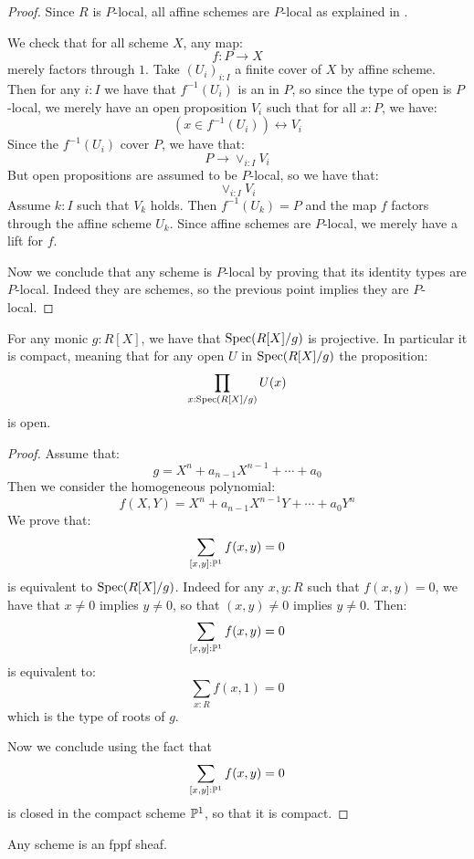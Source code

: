 \begin{proof}
Since $R$ is $P$-local, all affine schemes are $P$-local as explained in .

We check that for all scheme $X$, any map:
\[f:P\to X\]
merely factors through $1$. Take $(U_i)_{i:I}$ a finite cover of $X$ by affine scheme. Then for any $i:I$ we have that $f^{-1}(U_i)$ is an in $P$, so since the type of open is $P$-local, we merely have an open proposition $V_i$ such that for all $x:P$, we have:
\[(x\in f^{-1}(U_i) )\leftrightarrow V_i\]
Since the $f^{-1}(U_i)$ cover $P$, we have that:
\[P\to \lor_{i:I} V_i\]
But open propositions are assumed to be $P$-local, so we have that:
\[ \lor_{i:I} V_i\]
Assume $k:I$ such that $V_k$ holds. Then $f^{-1}(U_k) = P$ and the map $f$ factors through the affine scheme $U_k$. Since affine schemes are $P$-local, we merely have a lift for $f$.

Now we conclude that any scheme is $P$-local by proving that its identity types are $P$-local. Indeed they are schemes, so the previous point implies they are $P$-local.
\end{proof}

\begin{lemma}\label{roots-monic-proper}
For any monic $g:R[X]$, we have that $\operatorname{Spec}(R[X]/g)$ is projective. In particular it is compact, meaning that for any open $U$ in $\operatorname{Spec}(R[X]/g)$ the proposition:
\[\prod_{x:\operatorname{Spec}(R[X]/g)}U(x)\]
is open.
\end{lemma}

\begin{proof}
Assume that:
\[g=X^n+a_{n-1}X^{n-1}+\cdots+a_0\]
Then we consider the homogeneous polynomial:
\[f(X,Y) = X^n + a_{n-1}X^{n-1}Y+\cdots+a_0Y^n\]
We prove that:
\[\sum_{[x,y]:\mathbb{P}^1}f(x,y) = 0\]
is equivalent to $\operatorname{Spec}(R[X]/g)$. Indeed for any $x,y:R$ such that $f(x,y)=0$, we have that $x\not=0$ implies $y\not=0$, so that $(x,y)\not=0$ implies $y\not=0$. Then:
\[\sum_{[x,y]:\mathbb{P}^1}f(x,y) = 0\]
is equivalent to:
\[\sum_{x:R} f(x,1)=0\]
which is the type of roots of $g$. 

Now we conclude using the fact that 
\[\sum_{[x,y]:\mathbb{P}^1}f(x,y) = 0\]
is closed in the compact scheme $\mathbb{P}^1$, so that it is compact.
\end{proof}

\begin{proposition}\label{scheme-is-fppf-sheaf}
Any scheme is an fppf sheaf.
\end{proposition}

